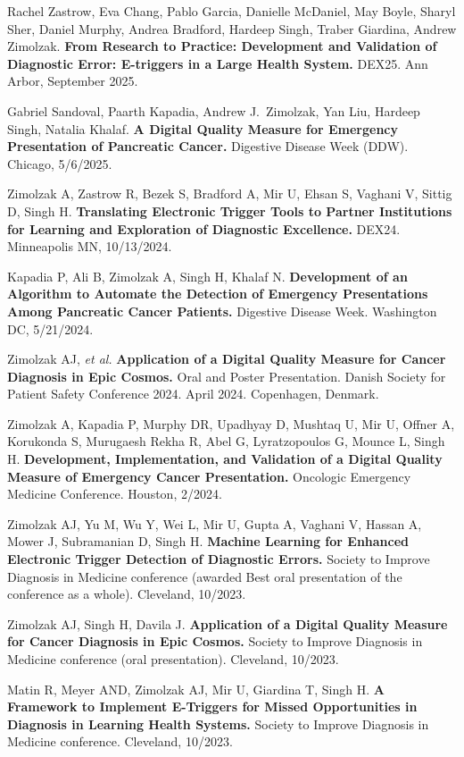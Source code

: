 \documentclass[10pt]{article}
\begin{document}
Rachel Zastrow, Eva Chang, Pablo Garcia, Danielle McDaniel, May Boyle,
Sharyl Sher, Daniel Murphy, Andrea Bradford, Hardeep Singh, Traber
Giardina, Andrew Zimolzak. \textbf{From Research to Practice:
  Development and Validation of Diagnostic Error: E-triggers in a
  Large Health System.} DEX25. Ann Arbor, September 2025.

Gabriel Sandoval, Paarth Kapadia, Andrew J.\ Zimolzak, Yan Liu,
Hardeep Singh, Natalia Khalaf. \textbf{A Digital Quality Measure for
  Emergency Presentation of Pancreatic Cancer.} Digestive Disease Week
(DDW). Chicago, 5/6/2025.


Zimolzak A, Zastrow R, Bezek S, Bradford A, Mir U, Ehsan S, Vaghani V,
Sittig D, Singh H. \textbf{Translating Electronic Trigger Tools to
  Partner Institutions for Learning and Exploration of Diagnostic
  Excellence.} DEX24. Minneapolis MN, 10/13/2024.

Kapadia P, Ali B, Zimolzak A, Singh H, Khalaf N. \textbf{Development
  of an Algorithm to Automate the Detection of Emergency Presentations
  Among Pancreatic Cancer Patients.} Digestive Disease Week.
Washington DC, 5/21/2024.

Zimolzak AJ, \emph{et al.} \textbf{Application of a Digital Quality
  Measure for Cancer Diagnosis in Epic Cosmos.} Oral and Poster
Presentation. Danish Society for Patient Safety Conference 2024. April
2024. Copenhagen, Denmark.

Zimolzak A, Kapadia P, Murphy DR, Upadhyay D, Mushtaq U, Mir U, Offner
A, Korukonda S, Murugaesh Rekha R, Abel G, Lyratzopoulos G, Mounce L,
Singh H. \textbf{Development, Implementation, and Validation of a
  Digital Quality Measure of Emergency Cancer Presentation.} Oncologic
Emergency Medicine Conference. Houston, 2/2024.


Zimolzak AJ, Yu M, Wu Y, Wei L, Mir U, Gupta A, Vaghani V, Hassan A,
Mower J, Subramanian D, Singh H. \textbf{Machine Learning for Enhanced
  Electronic Trigger Detection of Diagnostic Errors.} Society to
Improve Diagnosis in Medicine conference (awarded Best oral
presentation of the conference as a whole). Cleveland, 10/2023.

Zimolzak AJ, Singh H, Davila J. \textbf{Application of a Digital
  Quality Measure for Cancer Diagnosis in Epic Cosmos.} Society to
Improve Diagnosis in Medicine conference (oral presentation).
Cleveland, 10/2023.

Matin R, Meyer AND, Zimolzak AJ, Mir U, Giardina T, Singh H. \textbf{A
  Framework to Implement E-Triggers for Missed Opportunities in
  Diagnosis in Learning Health Systems.} Society to Improve Diagnosis
in Medicine conference. Cleveland, 10/2023.
\end{document}
